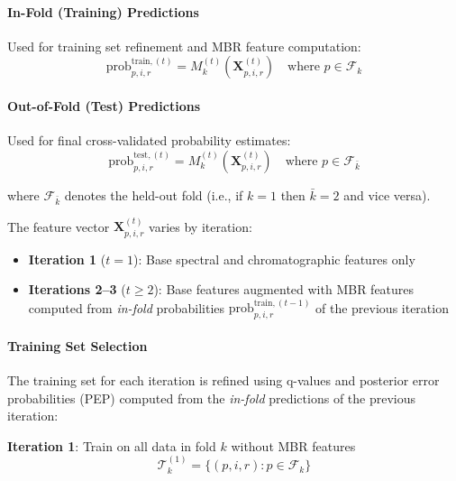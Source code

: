 \documentclass[pdflatex,sn-nature]{sn-jnl}
\begin{document}
\paragraph{In-Fold (Training) Predictions}\label{para:in-fold-training-predictions} Used for training set refinement and MBR feature computation:
\begin{equation}
  \text{prob}_{p,i,r}^{\text{train},(t)} = M_k^{(t)}(\mathbf{X}_{p,i,r}^{(t)}) \quad \text{where } p \in \mathcal{F}_k
\end{equation}

\paragraph{Out-of-Fold (Test) Predictions}\label{para:out-of-fold-test-predictions} Used for final cross-validated probability estimates:
\begin{equation}
  \text{prob}_{p,i,r}^{\text{test},(t)} = M_k^{(t)}(\mathbf{X}_{p,i,r}^{(t)}) \quad \text{where } p \in \mathcal{F}_{\bar{k}}
\end{equation}

where $\mathcal{F}_{\bar{k}}$ denotes the held-out fold (i.e., if $k=1$ then $\bar{k}=2$ and vice versa).

The feature vector $\mathbf{X}_{p,i,r}^{(t)}$ varies by iteration:
\begin{itemize}
  \item \textbf{Iteration 1} ($t=1$): Base spectral and chromatographic features only
  \item \textbf{Iterations 2--3} ($t \geq 2$): Base features augmented with MBR features computed from \emph{in-fold} probabilities $\text{prob}_{p,i,r}^{\text{train},(t-1)}$ of the previous iteration
\end{itemize}

\paragraph{Training Set Selection}\label{para:training-set-selection} The training set for each iteration is refined using q-values and posterior error probabilities (PEP) computed from the \emph{in-fold} predictions of the previous iteration:

\textbf{Iteration 1}: Train on all data in fold $k$ without MBR features
\begin{equation}
  \mathcal{T}_{k}^{(1)} = \{(p,i,r) : p \in \mathcal{F}_{k}\}
\end{equation}
\end{document}
